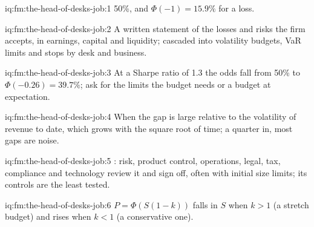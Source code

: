 \begin{solution}{iq:fm:the-head-of-desks-job:1}
50\%, and $\Phi(-1)=15.9\%$ for a loss.
\end{solution}

\begin{solution}{iq:fm:the-head-of-desks-job:2}
A written statement of the losses and risks the firm accepts, in earnings, capital and liquidity; cascaded into volatility budgets, VaR limits and
stops by desk and business.
\end{solution}

\begin{solution}{iq:fm:the-head-of-desks-job:3}
At a Sharpe ratio of 1.3 the odds fall from 50\% to $\Phi(-0.26)=39.7\%$; ask for the limits the budget needs or a budget at expectation.
\end{solution}

\begin{solution}{iq:fm:the-head-of-desks-job:4}
When the gap is large relative to the volatility of revenue to date, which grows with the square root of time; a quarter in, most gaps are noise.
\end{solution}

\begin{solution}{iq:fm:the-head-of-desks-job:5}
: risk, product control, operations, legal, tax, compliance and technology review it and sign off, often with initial size
limits; its controls are the least tested.
\end{solution}

\begin{solution}{iq:fm:the-head-of-desks-job:6}
$P=\Phi(S(1-k))$ falls in $S$ when $k>1$ (a stretch budget) and rises when $k<1$ (a conservative one).
\end{solution}
